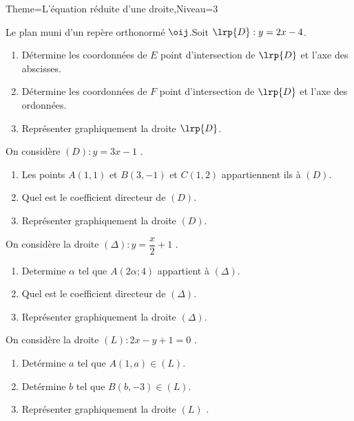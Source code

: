 \documentclass[a4paper,12pt]{article}
\begin{document}
\begin{Maquette}[Fiche]{Theme=L'équation réduite d'une droite,Niveau=3}
\begin{exercice}%
Le plan muni d'un repère orthonormé $\oij$.Soit $\lrp{D}:y=2x-4$.
\begin{enumerate}
\item Détermine les coordonnées de $E$ point d'intersection de $\lrp{D}$ et l'axe des abscisses.
\item Détermine les coordonnées de $F$ point d'intersection de $\lrp{D}$ et l'axe des ordonnées.
\item Représenter graphiquement la droite $\lrp{D}$.
\end{enumerate}
\end{exercice}

\begin{exercice}
On considère $(D): y=3x-1$ .
\begin{enumerate}
\item  Les points $A(1,1)$ et $B(3,-1)$ et $C(1,2)$  appartiennent ils à $(D)$.
\item Quel est le coefficient directeur de  $(D)$.
\item Représenter graphiquement la droite $(D)$.
\end{enumerate}
\end{exercice}

\begin{exercice}
On considère la droite  $(\Delta) : y= \dfrac{x}{2}+1$ .
\begin{enumerate}
\item Determine  $\alpha$ tel que $A(2\alpha ; 4)$ appartient à $(\Delta)$.
\item Quel est le coefficient directeur de $(\Delta)$.
\item Représenter graphiquement la droite $(\Delta)$.
\end{enumerate}
\end{exercice}

\begin{exercice}
On considère la droite $(L): 2x-y+1=0$ .
\begin{enumerate}
\item Detérmine  $a$ tel que $A(1,a)\in (L)$.
\item Detérmine  $b$ tel que $B(b,-3)\in (L)$.
\item Représenter graphiquement la droite  $(L)$ .
\end{enumerate}
\end{exercice}


\end{Maquette}
\end{document}
